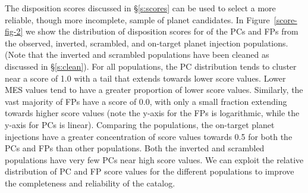 The disposition scores discussed in \S\ref{s:scores} can be used to select a more reliable, though more incomplete, sample of planet candidates. In Figure~\ref{score-fig-2} we show the distribution of disposition scores for of the PCs and FPs from the observed, inverted, scrambled, and on-target planet injection populations. (Note that the inverted and scrambled populations have been cleaned as discussed in \S\ref{s:clean}). For all populations, the PC distribution tends to cluster near a score of 1.0 with a tail that extends towards lower score values. Lower MES values tend to have a greater proportion of lower score values. Similarly, the vast majority of FPs have a score of 0.0, with only a small fraction extending towards higher score values (note the y-axis for the FPs is logarithmic, while the y-axis for PCs is linear). Comparing the populations, the on-target planet injections have a greater concentration of score values towards 0.5 for both the PCs and FPs than other populations. Both the inverted and scrambled populations have very few PCs near high score values. We can exploit the relative distribution of PC and FP score values for the different populations to improve the completeness and reliability of the catalog.

